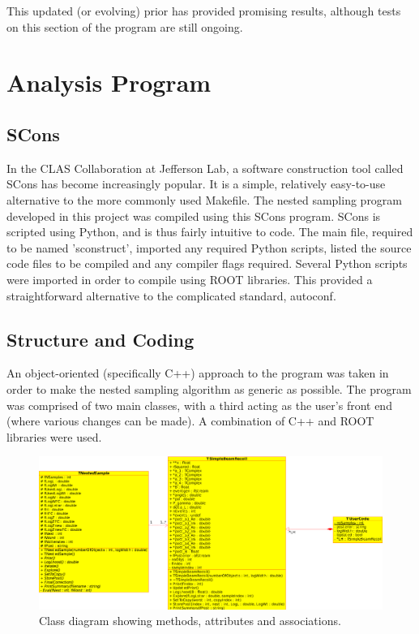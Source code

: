 \documentclass[a4paper,12pt]{article}
\begin{document}
This updated (or evolving) prior has provided promising results, although tests on this section of the program are still ongoing.

\section{Analysis Program}
\subsection{SCons}
In the CLAS Collaboration at Jefferson Lab, a software construction tool called SCons \cite{scons} has become increasingly popular.  It is a simple, relatively easy-to-use alternative to the more commonly used Makefile.  The nested sampling program developed in this project was compiled using this SCons program.  SCons is scripted using Python, and is thus fairly intuitive to code.  The main file, required to be named 'sconstruct', imported any required Python scripts, listed the source code files to be compiled and any compiler flags required. Several Python scripts were imported in order to compile using ROOT libraries.  This provided a straightforward alternative to the complicated standard, autoconf.


 
\subsection{Structure and Coding}
An object-oriented (specifically C++) approach to the program was taken in order to make the nested sampling algorithm as generic as possible.  The program was comprised of two main classes, with a third acting as the user's front end (where various changes can be made). A combination of C++ and ROOT libraries were used.  
\newline

\begin{figure}[!h]
 \begin{center}
  \includegraphics[scale=0.5]{class_diagram.eps}
  \caption{Class diagram showing methods, attributes and associations.}
 \end{center}
\end{figure}
\end{document}

